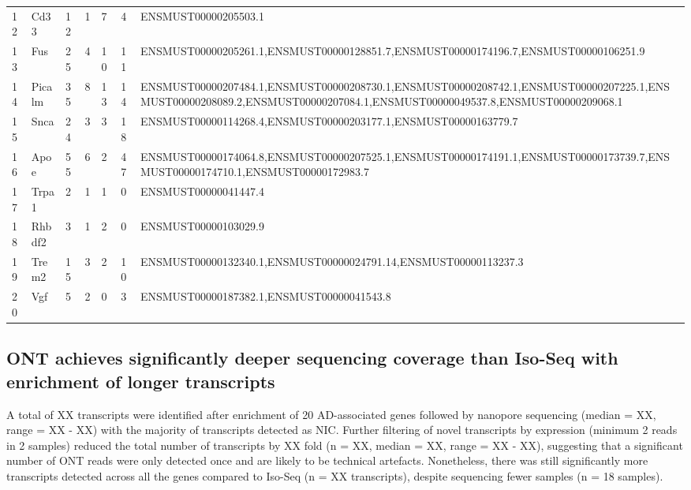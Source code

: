 \begin{landscape}
\begin{table}[]
\begin{tabular}{@{}lllllll@{}}
			12 & Cd33 & 12 & 1 & 7 & 4 & ENSMUST00000205503.1 \\
			13 & Fus & 25 & 4 & 10 & 11 & ENSMUST00000205261.1,ENSMUST00000128851.7,ENSMUST00000174196.7,ENSMUST00000106251.9 \\
			14 & Picalm & 35 & 8 & 13 & 14 & ENSMUST00000207484.1,ENSMUST00000208730.1,ENSMUST00000208742.1,ENSMUST00000207225.1,ENSMUST00000208089.2,ENSMUST00000207084.1,ENSMUST00000049537.8,ENSMUST00000209068.1 \\
			15 & Snca & 24 & 3 & 3 & 18 & ENSMUST00000114268.4,ENSMUST00000203177.1,ENSMUST00000163779.7 \\
			16 & Apoe & 55 & 6 & 2 & 47 & ENSMUST00000174064.8,ENSMUST00000207525.1,ENSMUST00000174191.1,ENSMUST00000173739.7,ENSMUST00000174710.1,ENSMUST00000172983.7 \\
			17 & Trpa1 & 2 & 1 & 1 & 0 & ENSMUST00000041447.4 \\
			18 & Rhbdf2 & 3 & 1 & 2 & 0 & ENSMUST00000103029.9 \\
			19 & Trem2 & 15 & 3 & 2 & 10 & ENSMUST00000132340.1,ENSMUST00000024791.14,ENSMUST00000113237.3 \\
			20 & Vgf & 5 & 2 & 0 & 3 & ENSMUST00000187382.1,ENSMUST00000041543.8 \\ \bottomrule
		\end{tabular}
	\end{table}
\end{landscape}

\subsection{ONT achieves significantly deeper sequencing coverage than Iso-Seq with enrichment of longer transcripts}
A total of XX transcripts were identified after enrichment of 20 AD-associated genes followed by nanopore sequencing (median = XX, range = XX - XX) with the majority of transcripts detected as NIC. Further filtering of novel transcripts by expression (minimum 2 reads in 2 samples) reduced the total number of transcripts by XX fold (n = XX, median = XX, range = XX - XX), suggesting that a significant number of ONT reads were only detected once and are likely to be technical artefacts. Nonetheless, there was still significantly more transcripts detected across all the genes compared to Iso-Seq (n = XX transcripts), despite sequencing fewer samples (n = 18 samples). 

